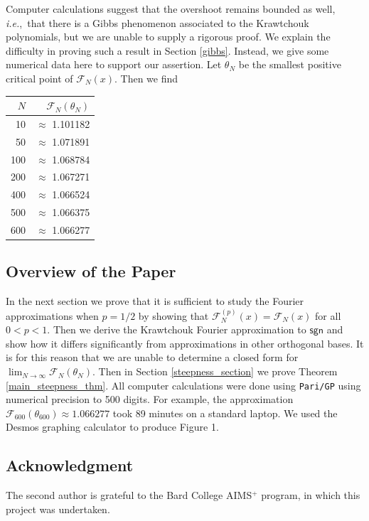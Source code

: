 \documentclass{amsart}
\newcommand{\sgn}{\mathsf{sgn}}
\theoremstyle{plain}
\theoremstyle{remark}
\begin{document}
Computer calculations suggest that the overshoot remains bounded as well, \emph{i.e.},~that there is a Gibbs phenomenon associated to the Krawtchouk polynomials, but we are unable to supply a rigorous proof.  We explain the difficulty in proving such a result in Section \ref{gibbs}.  Instead, we give some numerical data here to support our assertion.  Let $\theta_N$ be the smallest positive critical point of $\mathcal{F}_{N}(x)$.  Then we find
\begin{center}
\begin{tabular}{rr}
$N$ & $\mathcal{F}_N(\theta_N)$ \\
\hline
10 & $\approx$ 1.101182 \\
50 & $\approx$ 1.071891 \\
100 & $\approx$ 1.068784 \\
200 & $\approx$ 1.067271 \\
400 & $\approx$ 1.066524 \\
500 & $\approx$ 1.066375 \\
600 & $\approx$ 1.066277
\end{tabular}
\end{center}

\subsection{Overview of the Paper} In the next section we prove that it is sufficient to study the Fourier approximations when $p=1/2$ by showing that $\mathcal{F}_N^{(p)}(x) = \mathcal{F}_N(x)$ for all $0 < p < 1$. Then we derive the  Krawtchouk Fourier  approximation to $\sgn$ and  show how it differs significantly from approximations in other orthogonal bases.  It is for this reason that we are unable to determine a closed form for $\lim_{N \to \infty} \mathcal{F}_N(\theta_N)$.  Then in Section \ref{steepness_section} we prove Theorem \ref{main_steepness_thm}.   All computer calculations were done using \texttt{Pari/GP} \cite{pari} using numerical precision to 500 digits.  For example, the approximation $\mathcal{F}_{600}(\theta_{600}) \approx 1.066277$ took 89 minutes on a standard laptop. We used the Desmos graphing calculator \cite{desmos} to produce Figure 1.

\subsection{Acknowledgment} The second author is grateful to the Bard College AIMS$^+$ program, in which this project was undertaken.
\end{document}
